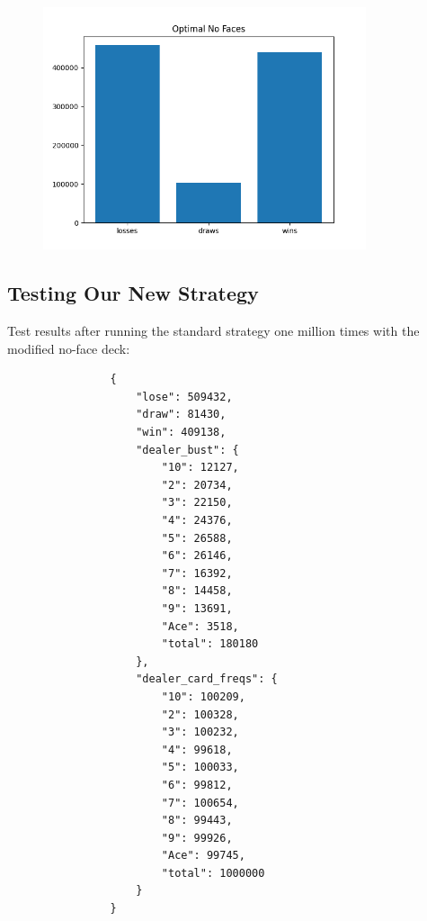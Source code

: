 \documentclass{article}
\begin{document}
{		\begin{figure}
			\hypertarget{fig3}{}
			\begin{center}
				\includegraphics[width=9.5cm]{optimalNF.png}
			\end{center}
		\end{figure}
        
        \subsection{Testing Our New Strategy}
        \label{Testing Our New Strategy}

        Test results after running the standard strategy one million times with the modified no-face deck:

			
		}

        \begin{verbatim}
                {
                    "lose": 509432,
                    "draw": 81430,
                    "win": 409138,
                    "dealer_bust": {
                        "10": 12127,
                        "2": 20734,
                        "3": 22150,
                        "4": 24376,
                        "5": 26588,
                        "6": 26146,
                        "7": 16392,
                        "8": 14458,
                        "9": 13691,
                        "Ace": 3518,
                        "total": 180180
                    },
                    "dealer_card_freqs": {
                        "10": 100209,
                        "2": 100328,
                        "3": 100232,
                        "4": 99618,
                        "5": 100033,
                        "6": 99812,
                        "7": 100654,
                        "8": 99443,
                        "9": 99926,
                        "Ace": 99745,
                        "total": 1000000
                    }
                }
        \end{verbatim}
\end{document}
